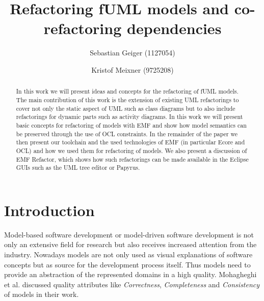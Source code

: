 \documentclass{llncs}
\begin{document}
\renewcommand{\thelstlisting}{\arabic{lstlisting}}
\pagestyle{plain}

\title{Refactoring fUML models and co-refactoring dependencies}


\author{Sebastian Geiger (1127054) \and Kristof Meixner (9725208)}
\maketitle

\begin{abstract}
In this work we will present ideas and concepts for the refactoring of fUML models. The main contribution of this work is 
the extension of existing UML refactorings to cover not only the static aspect of UML such as class diagrams but to also 
include refactorings for dynamic
parts such as activity diagrams. In this work we will present basic concepts for refactoring of models with EMF and show how model semantics can be
preserved through the use of OCL constraints. In the remainder of the paper we then present our toolchain and the used technologies
of EMF (in particular Ecore and OCL) and how we used them for refactoring of models. We also present a discussion of EMF Refactor, which shows how such refactorings
can be made available in the Eclipse GUIs such as the UML tree editor or Papyrus.
\end{abstract}

\tableofcontents
\newpage


\section{Introduction}

Model-based software development or model-driven software development is not only an extensive field for research but
also receives increased attention from the industry. Nowadays models are not only used as visual explanations of
software concepts but as source for the development process itself. Thus models need to provide an abstraction of
the represented domains in a high quality. Mohagheghi et al. \cite{DBLP:journals/infsof/MohagheghiDN09} discussed 
quality attributes like \textit{Correctness}, \textit{Completeness} and \textit{Consistency} of models in their work.
\end{document}
